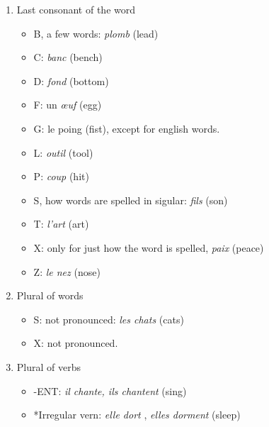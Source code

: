 \documentclass{book}
\begin{document}
\begin{enumerate}
        \item Last consonant of the word
            \begin{itemize}
                \item B, a few words: \textit{plomb} \textipa{[pl\~{O}]} (lead)
                \item C: \textit{banc} \textipa{[b\~{a}]} (bench)
                \item D: \textit{fond} \textipa{[f\~{O}]} (bottom)
                \item F: un \textit{œuf} \textipa{[2f]} (egg)
                \item G: le poing \textipa{[pw\~{a}]} (fist), except for english words.
                \item L: \textit{outil} \textipa{[uti]} (tool)
                \item P: \textit{coup} \textipa{[ku]} (hit)
                \item S, how words are spelled in sigular: \textit{fils} \textipa{[fis]} (son)
                \item T: \textit{l'art} \textipa{[laR]} (art)
                \item X: only for just how the word is spelled, \textit{paix} \textipa{[pE]} (peace)
                \item Z: \textit{le nez} \textipa{[l@ne]} (nose)
            \end{itemize}

        \item Plural of words
            \begin{itemize}
                \item S: not pronounced: \textit{les chats} \textipa{[leSa]} (cats)
                \item X: not pronounced.
            \end{itemize}
        
        \item Plural of verbs
            \begin{itemize}
                \item -ENT: \textit{il chante, ils chantent} \textipa{[il S\~{a}t]} (sing)
                \item *Irregular vern: \textit{elle dort} \textipa{[El dOr]}, \textit{elles dorment} \textipa{[il dOrm]} (sleep)
            \end{itemize}


\end{enumerate}
\end{document}
